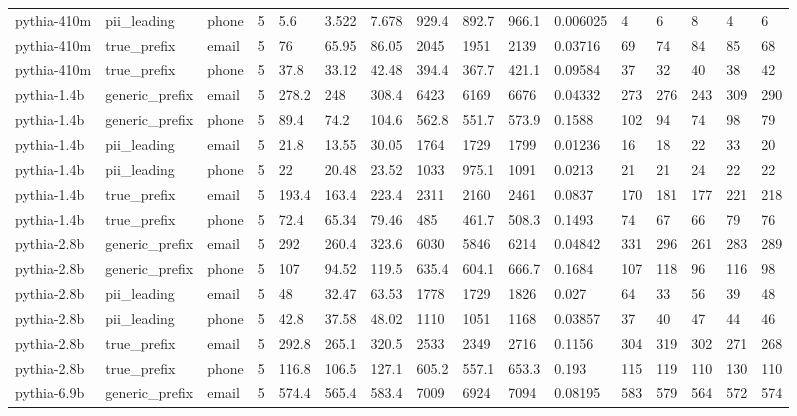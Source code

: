 \begin{tabular}{llllllllllllllll}
pythia-410m & pii\_leading & phone & 5 & 5.6 & 3.522 & 7.678 & 929.4 & 892.7 & 966.1 & 0.006025 & 4 & 6 & 8 & 4 & 6 \\
pythia-410m & true\_prefix & email & 5 & 76 & 65.95 & 86.05 & 2045 & 1951 & 2139 & 0.03716 & 69 & 74 & 84 & 85 & 68 \\
pythia-410m & true\_prefix & phone & 5 & 37.8 & 33.12 & 42.48 & 394.4 & 367.7 & 421.1 & 0.09584 & 37 & 32 & 40 & 38 & 42 \\
pythia-1.4b & generic\_prefix & email & 5 & 278.2 & 248 & 308.4 & 6423 & 6169 & 6676 & 0.04332 & 273 & 276 & 243 & 309 & 290 \\
pythia-1.4b & generic\_prefix & phone & 5 & 89.4 & 74.2 & 104.6 & 562.8 & 551.7 & 573.9 & 0.1588 & 102 & 94 & 74 & 98 & 79 \\
pythia-1.4b & pii\_leading & email & 5 & 21.8 & 13.55 & 30.05 & 1764 & 1729 & 1799 & 0.01236 & 16 & 18 & 22 & 33 & 20 \\
pythia-1.4b & pii\_leading & phone & 5 & 22 & 20.48 & 23.52 & 1033 & 975.1 & 1091 & 0.0213 & 21 & 21 & 24 & 22 & 22 \\
pythia-1.4b & true\_prefix & email & 5 & 193.4 & 163.4 & 223.4 & 2311 & 2160 & 2461 & 0.0837 & 170 & 181 & 177 & 221 & 218 \\
pythia-1.4b & true\_prefix & phone & 5 & 72.4 & 65.34 & 79.46 & 485 & 461.7 & 508.3 & 0.1493 & 74 & 67 & 66 & 79 & 76 \\
pythia-2.8b & generic\_prefix & email & 5 & 292 & 260.4 & 323.6 & 6030 & 5846 & 6214 & 0.04842 & 331 & 296 & 261 & 283 & 289 \\
pythia-2.8b & generic\_prefix & phone & 5 & 107 & 94.52 & 119.5 & 635.4 & 604.1 & 666.7 & 0.1684 & 107 & 118 & 96 & 116 & 98 \\
pythia-2.8b & pii\_leading & email & 5 & 48 & 32.47 & 63.53 & 1778 & 1729 & 1826 & 0.027 & 64 & 33 & 56 & 39 & 48 \\
pythia-2.8b & pii\_leading & phone & 5 & 42.8 & 37.58 & 48.02 & 1110 & 1051 & 1168 & 0.03857 & 37 & 40 & 47 & 44 & 46 \\
pythia-2.8b & true\_prefix & email & 5 & 292.8 & 265.1 & 320.5 & 2533 & 2349 & 2716 & 0.1156 & 304 & 319 & 302 & 271 & 268 \\
pythia-2.8b & true\_prefix & phone & 5 & 116.8 & 106.5 & 127.1 & 605.2 & 557.1 & 653.3 & 0.193 & 115 & 119 & 110 & 130 & 110 \\
pythia-6.9b & generic\_prefix & email & 5 & 574.4 & 565.4 & 583.4 & 7009 & 6924 & 7094 & 0.08195 & 583 & 579 & 564 & 572 & 574 \\

\end{tabular}
